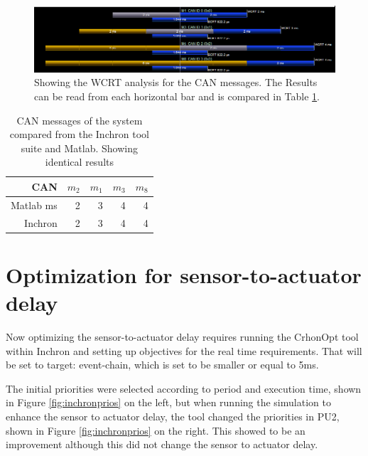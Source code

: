 \begin{figure}[h!]
	\begin{center}
		\includegraphics[width=\linewidth]{img/messagesCANtimings}
		\caption{Showing the WCRT analysis for the CAN messages. The Results can be read from each horizontal bar and is compared in Table \ref{tab:can-rts}.}
		\label{fig:msgCANtiming}
	\end{center}
\end{figure}

\begin{table}[htbp!]
	\centering
	\caption{CAN messages of the system compared from the Inchron tool suite and Matlab. Showing identical results}
	\begin{tabular}{rrrrr}
		\toprule
		CAN     & $m_2$   & $m_1$   & $m_3$   & $m_8$ \\
		\midrule
		Matlab ms & 2       & 3       & 4       & 4 \\
		Inchron & 2       & 3       & 4       & 4 \\
		\bottomrule
	\end{tabular}%
	\label{tab:can-rts}%
\end{table}%


\section{Optimization for sensor-to-actuator delay}

Now optimizing the sensor-to-actuator delay requires running the CrhonOpt tool within Inchron and setting up objectives for the real time requirements. That will be set to target: event-chain, which is set to be smaller or equal to 5ms.

The initial priorities were selected according to period and execution time, shown in Figure \ref{fig:inchronprios} on the left, but when running the simulation to enhance the sensor to actuator delay, the tool changed the priorities in PU2, shown in Figure \ref{fig:inchronprios} on the right. This showed to be an improvement although this did not change the sensor to actuator delay.

